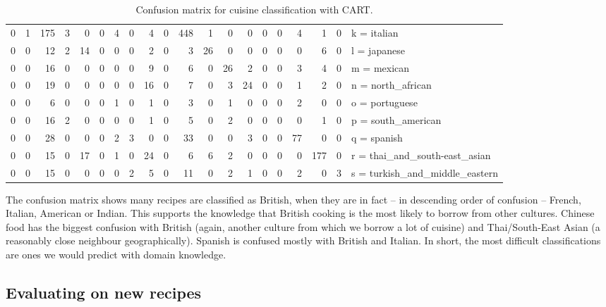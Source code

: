 \documentclass[11pt,a4paper]{article}
\begin{document}
\begin{sidewaystable}
\begin{tabular}{r r r r r r r r r r r r r r r r r r r | l}
    0&   1& 175&   3&   0&   0&   4&   0&   4&   0& 448&   1&   0&   0&   0&   0&   4&   1&   0& k = italian \\
    0&   0&  12&   2&  14&   0&   0&   0&   2&   0&   3&  26&   0&   0&   0&   0&   0&   6&   0& l = japanese \\
    0&   0&  16&   0&   0&   0&   0&   0&   9&   0&   6&   0&  26&   2&   0&   0&   3&   4&   0& m = mexican \\
    0&   0&  19&   0&   0&   0&   0&   0&  16&   0&   7&   0&   3&  24&   0&   0&   1&   2&   0& n = north\_african \\
    0&   0&   6&   0&   0&   0&   1&   0&   1&   0&   3&   0&   1&   0&   0&   0&   2&   0&   0& o = portuguese \\
    0&   0&  16&   2&   0&   0&   0&   0&   1&   0&   5&   0&   2&   0&   0&   0&   0&   1&   0& p = south\_american \\
    0&   0&  28&   0&   0&   0&   2&   3&   0&   0&  33&   0&   0&   3&   0&   0&  77&   0&   0& q = spanish \\
    0&   0&  15&   0&  17&   0&   1&   0&  24&   0&   6&   6&   2&   0&   0&   0&   0& 177&   0& r = thai\_and\_south-east\_asian \\
    0&   0&  15&   0&   0&   0&   0&   2&   5&   0&  11&   0&   2&   1&   0&   0&   2&   0&   3& s = turkish\_and\_middle\_eastern \\
  \end{tabular}
  \caption{Confusion matrix for cuisine classification with CART.}
  \label{tab:confusion}
\end{sidewaystable}

The confusion matrix shows many recipes are classified as British, when they are in
fact -- in descending order of confusion -- French, Italian, American or Indian. This
supports the knowledge that British cooking is the most likely to borrow
from other cultures. Chinese food has the biggest confusion with British (again,
another culture from which we borrow a lot of cuisine) and Thai/South-East Asian (a
reasonably close neighbour geographically). Spanish is confused mostly with British
and Italian. In short, the most difficult classifications are ones we would predict
with domain knowledge.

\subsection{Evaluating on new recipes}
\end{document}
